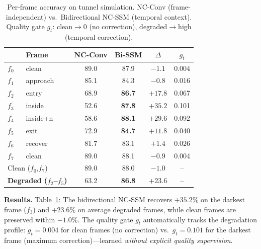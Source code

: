 \documentclass[runningheads]{llncs}
\begin{document}
\begin{table}[t]
\centering
\caption{Per-frame accuracy on tunnel simulation. NC-Conv (frame-independent) vs.\ Bidirectional NC-SSM (temporal context). Quality gate $g_t$: clean$\to$0 (no correction), degraded$\to$high (temporal correction).}
\label{tab:temporal}
\small
\begin{tabular}{@{}llcccc@{}}
\toprule
& \textbf{Frame} & \textbf{NC-Conv} & \textbf{Bi-SSM} & $\Delta$ & $g_t$ \\
\midrule
$f_0$ & clean      & 89.0 & 87.9 & $-1.1$ & 0.004 \\
$f_1$ & approach   & 85.1 & 84.3 & $-0.8$ & 0.016 \\
$f_2$ & entry      & 68.9 & \textbf{86.7} & $+17.8$ & 0.067 \\
$f_3$ & inside     & 52.6 & \textbf{87.8} & $\mathbf{+35.2}$ & 0.101 \\
$f_4$ & inside+n   & 58.6 & \textbf{88.1} & $+29.6$ & 0.092 \\
$f_5$ & exit       & 72.9 & \textbf{84.7} & $+11.8$ & 0.040 \\
$f_6$ & recover    & 81.7 & 83.1 & $+1.4$ & 0.026 \\
$f_7$ & clean      & 89.0 & 88.1 & $-0.9$ & 0.004 \\
\midrule
\multicolumn{2}{l}{Clean ($f_0$,$f_7$)} & 89.0 & 88.0 & $-1.0$ & -- \\
\multicolumn{2}{l}{\textbf{Degraded ($f_2$--$f_5$)}} & 63.2 & \textbf{86.8} & $\mathbf{+23.6}$ & -- \\
\bottomrule
\end{tabular}
\end{table}

\noindent\textbf{Results.}
Table~\ref{tab:temporal}: The bidirectional NC-SSM recovers $+35.2\%$ on the darkest frame ($f_3$) and $+23.6\%$ on average degraded frames, while clean frames are preserved within $-1.0\%$.
The quality gate $g_t$ automatically tracks the degradation profile: $g_t = 0.004$ for clean frames (no correction) vs.\ $g_t = 0.101$ for the darkest frame (maximum correction)---learned \emph{without explicit quality supervision}.
\end{document}

